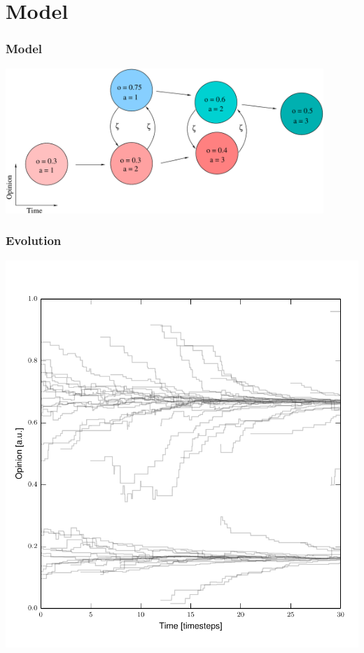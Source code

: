 \documentclass[10pt]{beamer}
\begin{document}
\section{Model}
\begin{frame}\frametitle{Model}

    \begin{center}
        \includegraphics[width=0.9\textwidth]{src/internals.pdf}
    \end{center}
    

\end{frame}


\begin{frame}\frametitle{Evolution}
    \begin{center}
        \includegraphics[height=0.9\textheight]{src/evol_03}
    \end{center}
    

\end{frame}
\end{document}
